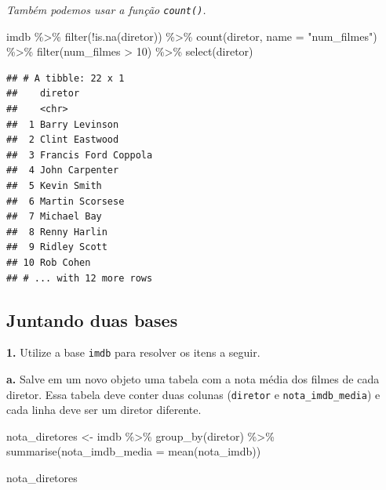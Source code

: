 \documentclass[
]{book}
\newenvironment{Shaded}{\begin{snugshade}}{\end{snugshade}}
\newcommand{\AttributeTok}[1]{\textcolor[rgb]{0.77,0.63,0.00}{#1}}
\newcommand{\DecValTok}[1]{\textcolor[rgb]{0.00,0.00,0.81}{#1}}
\newcommand{\FunctionTok}[1]{\textcolor[rgb]{0.00,0.00,0.00}{#1}}
\newcommand{\NormalTok}[1]{#1}
\newcommand{\OtherTok}[1]{\textcolor[rgb]{0.56,0.35,0.01}{#1}}
\newcommand{\SpecialCharTok}[1]{\textcolor[rgb]{0.00,0.00,0.00}{#1}}
\newcommand{\StringTok}[1]{\textcolor[rgb]{0.31,0.60,0.02}{#1}}
\begin{document}
\emph{Também podemos usar a função \texttt{count()}.}

\begin{Shaded}
\begin{Highlighting}[]
\NormalTok{imdb }\SpecialCharTok{\%\textgreater{}\%} 
  \FunctionTok{filter}\NormalTok{(}\SpecialCharTok{!}\FunctionTok{is.na}\NormalTok{(diretor)) }\SpecialCharTok{\%\textgreater{}\%} 
  \FunctionTok{count}\NormalTok{(diretor, }\AttributeTok{name =} \StringTok{"num\_filmes"}\NormalTok{) }\SpecialCharTok{\%\textgreater{}\%} 
  \FunctionTok{filter}\NormalTok{(num\_filmes }\SpecialCharTok{\textgreater{}} \DecValTok{10}\NormalTok{) }\SpecialCharTok{\%\textgreater{}\%} 
  \FunctionTok{select}\NormalTok{(diretor)}
\end{Highlighting}
\end{Shaded}

\begin{verbatim}
## # A tibble: 22 x 1
##    diretor             
##    <chr>               
##  1 Barry Levinson      
##  2 Clint Eastwood      
##  3 Francis Ford Coppola
##  4 John Carpenter      
##  5 Kevin Smith         
##  6 Martin Scorsese     
##  7 Michael Bay         
##  8 Renny Harlin        
##  9 Ridley Scott        
## 10 Rob Cohen           
## # ... with 12 more rows
\end{verbatim}

\hypertarget{juntando-duas-bases-1}{%
\subsection*{Juntando duas bases}\label{juntando-duas-bases-1}}

\textbf{1.} Utilize a base \texttt{imdb} para resolver os itens a seguir.

\textbf{a.} Salve em um novo objeto uma tabela com a
nota média dos filmes de cada diretor. Essa tabela
deve conter duas colunas (\texttt{diretor} e \texttt{nota\_imdb\_media})
e cada linha deve ser um diretor diferente.

\begin{Shaded}
\begin{Highlighting}[]
\NormalTok{nota\_diretores }\OtherTok{\textless{}{-}}\NormalTok{ imdb }\SpecialCharTok{\%\textgreater{}\%} 
  \FunctionTok{group\_by}\NormalTok{(diretor) }\SpecialCharTok{\%\textgreater{}\%} 
  \FunctionTok{summarise}\NormalTok{(}\AttributeTok{nota\_imdb\_media =} \FunctionTok{mean}\NormalTok{(nota\_imdb))}

\NormalTok{nota\_diretores}
\end{Highlighting}
\end{Shaded}
\end{document}

